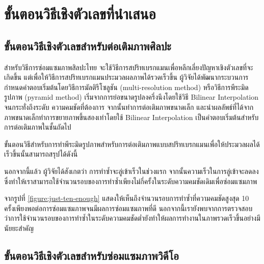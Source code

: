 \section{ขั้นตอนวิธีเชิงตัวเลขที่นำเสนอ}
\subsection{ขั้นตอนวิธีเชิงตัวเลขสำหรับต่อเติมภาพศิลปะ}

\hspace{1cm} สำหรับวิธีการซ่อมแซมภาพสิลปะไทย จะใช้วิธีการสปริทเบรกแมนเพื่อหลีกเลี่ยงปัญหาเชิงตัวเลขที่จะเกิดขึ้น แต่เพื่อให้วิธีการสปริทเบรกแมนประมวลผลภาพได้รวดเร็วขึ้น ผู้วิจัยได้พัฒนากระบวนการกำหนดคำตอบเริ่มต้นโดยวิธีการมัลติรีโซลูชัน (multi-resolution method) หรือวิธีการพีระมิดรูปภาพ (pyramid method) \cite{ref:image-pyramid}
เริ่มจากการย่อขนาดรูปลงครึ่งนึงโดยใช้วิธี Bilinear Interpolation จนกระทั่งถึงระดับ \break ความคมชัดที่ต้องการ จากนั้นทำการต่อเติมภาพขนาดเล็ก และนำผลลัพธ์ที่ได้จากภาพขนาดเล็กทำการขยายภาพขึ้นสองเท่าโดยใช้ Bilinear Interpolation เป็นคำตอบเริ่มต้นสำหรับการต่อเติมภาพในชั้นถัดไป

\hspace{1cm} ขั้นตอนวิธีสำหรับการทำพีระมิดรูปภาพสำหรับการต่อเติมภาพแบบสปริทเบรกแมนเพื่อให้ประมวลผลได้เร็วขึ้นนั้นสามารถสรุปได้ดังนี้\\




\vspace{0.5cm}



\hspace{1cm} นอกจากนี้แล้ว ผู้วิจัยได้สังเกตว่า การทำซ้ำจะลู่เข้าเร็วในช่วงแรก จากนั้นความเร็วในการลู่เข้าจะลดลง ซึ่งทำให้เราสามารถใช้จำนวนรอบของการทำซ้ำเพียงไม่กี่ครั้งในระดับความคมชัดเดิมเพื่อซ่อมแซมภาพ



\hspace{1cm} 
จากรูปที่ \ref{figure:just-ten-enough}
แสดงให้เห็นถึงจำนวนรอบการทำซ้ำที่ความคมชัดสูงสุด 10 ครั้งเพียงพอต่อการซ่อมแซมภาพจนมีผลการซ่อมแซมภาพที่ดี นอกจากนี้เรายังพบจากการตรวจสอบว่าการใช้จำนวนรอบของการทำซ้ำในระดับความคมชัดต่ำยังทำให้ผลการทำงานในภาพรวดเร็วขึ้นอย่างมีนัยยะสำคัญ

\subsection{ขั้นตอนวิธีเชิงตัวเลขสำหรับซ่อมแซมภาพวิดีโอ}

